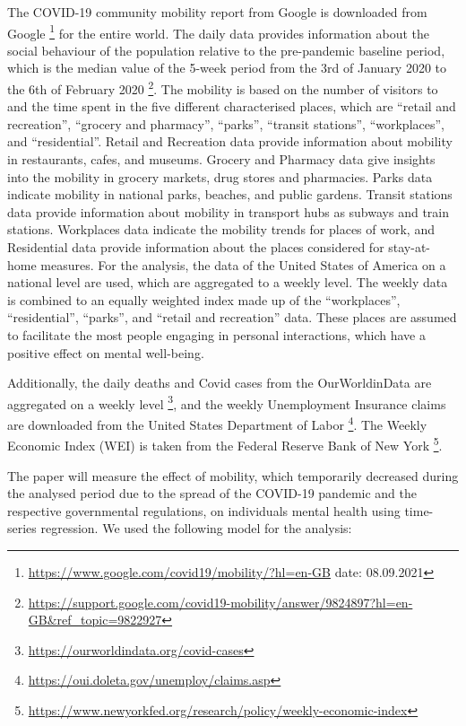 The COVID-19 community mobility report from Google is downloaded from Google \footnote{\url {https://www.google.com/covid19/mobility/?hl=en-GB} date: 08.09.2021} for the entire world. The daily data provides information about the social behaviour of the population relative to the pre-pandemic baseline period, which is the median value of the 5-week period from the 3rd of January 2020 to the 6th of February 2020 \footnote{\url{https://support.google.com/covid19-mobility/answer/9824897?hl=en-GB&ref\_topic=9822927}}. The mobility is based on the number of visitors to and the time spent in the five different characterised places, which are “retail and recreation”, “grocery and pharmacy”, “parks”, “transit stations”, “workplaces”, and “residential”. Retail and Recreation data provide information about mobility in restaurants, cafes, and museums. Grocery and Pharmacy data give insights into the mobility in grocery markets, drug stores and pharmacies. Parks data indicate mobility in national parks, beaches, and public gardens. Transit stations data provide information about mobility in transport hubs as subways and train stations. Workplaces data indicate the mobility trends for places of work, and Residential data provide information about the places considered for stay-at-home measures. For the analysis, the data of the United States of America on a national level are used, which are aggregated to a weekly level. The weekly data is combined to an equally weighted index made up of the “workplaces”, “residential”, “parks”, and “retail and recreation” data. These places are assumed to facilitate the most people engaging in personal interactions, which have a positive effect on mental well-being.

Additionally, the daily deaths and Covid cases from the OurWorldinData are aggregated on a weekly level \footnote{\url{https://ourworldindata.org/covid-cases}}, and the weekly Unemployment Insurance claims are downloaded from the United States Department of Labor \footnote{\url{https://oui.doleta.gov/unemploy/claims.asp}}. The Weekly Economic Index (WEI) is taken from the Federal Reserve Bank of New York \footnote{\url{https://www.newyorkfed.org/research/policy/weekly-economic-index}}.

The paper will measure the effect of mobility, which temporarily decreased during the analysed period due to the spread of the COVID-19 pandemic and the respective governmental regulations, on individuals mental health using time-series regression. We used the following model for the analysis:


